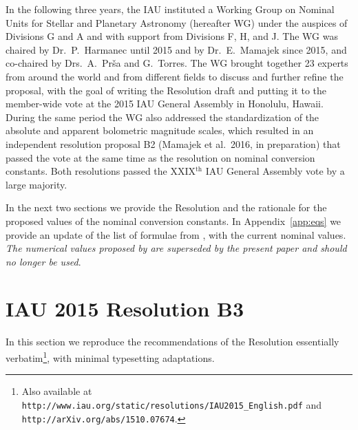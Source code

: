 \documentclass[preprint]{aastex}
\newcommand{\rev}[1]{{#1}}
\begin{document}
In the following three years, the IAU instituted a Working Group on Nominal Units for Stellar and Planetary Astronomy (hereafter WG) under the auspices of Divisions G and A and with support from Divisions F, H, and J. The WG was chaired by Dr.\ P.\ Harmanec until 2015 and by Dr.\ E.\ Mamajek since 2015, and co-chaired by Drs.\ A.\ Pr\v sa and G.\ Torres. The WG \rev{brought together} 23 experts from around the world and from different fields to discuss and further refine the proposal, with the goal of writing the Resolution draft and putting it to the member-wide vote at the 2015 IAU General Assembly in Honolulu, Hawaii. During the same \rev{period} the WG also addressed the standardization of the absolute and apparent bolometric magnitude scales, which resulted in an independent resolution proposal B2 (Mamajek et al.~2016, in preparation) that passed the vote at the same time as the resolution on nominal conversion constants. Both resolutions passed the XXIX${}^\mathrm{th}$ IAU General Assembly vote by a large majority.

In the next two sections we provide the Resolution and the rationale for the proposed values of the nominal conversion constants. In Appendix~\ref{app:eqs} we provide an update of the list of formulae from \citet{harmanec2011}, with the current nominal values. \emph{The numerical values proposed by \citet{harmanec2011} are superseded by the present paper and should no longer be used}.

\section{IAU 2015 Resolution B3}

In this section we reproduce the recommendations of the Resolution essentially verbatim\footnote{Also available at {\tt http://www.iau.org/static/resolutions/IAU2015\_English.pdf} and \\ {\tt http://arXiv.org/abs/1510.07674}.}, with minimal typesetting adaptations.
\end{document}
